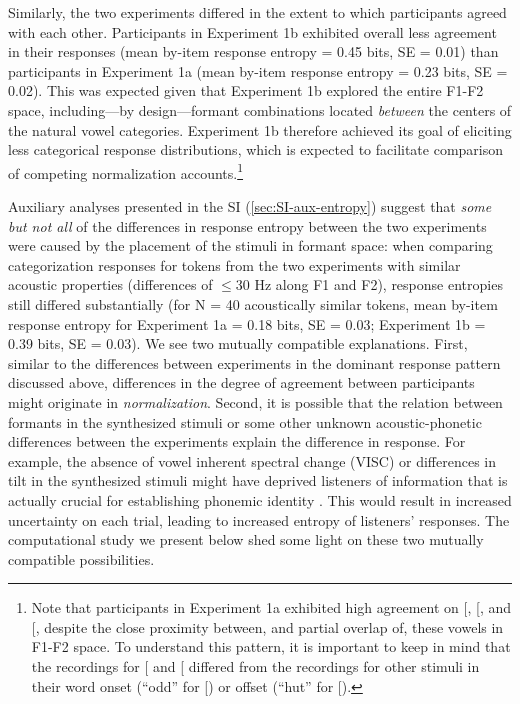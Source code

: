 \documentclass[preprint]{JASA}
\begin{document}
Similarly, the two experiments differed in the extent to which participants agreed with each other. Participants in Experiment 1b exhibited overall less agreement in their responses (mean by-item response entropy = 0.45 bits, SE = 0.01) than participants in Experiment 1a (mean by-item response entropy = 0.23 bits, SE = 0.02). This was expected given that Experiment 1b explored the entire F1-F2 space, including---by design---formant combinations located \emph{between} the centers of the natural vowel categories. Experiment 1b therefore achieved its goal of eliciting less categorical response distributions, which is expected to facilitate comparison of competing normalization accounts.\footnote{Note that participants in Experiment 1a exhibited high agreement on {[}\ipatext{ʌ}{]}, {[}\ipatext{æ}{]}, and {[}\ipatext{ɑ}{]}, despite the close proximity between, and partial overlap of, these vowels in F1-F2 space. To understand this pattern, it is important to keep in mind that the recordings for {[}\ipatext{ʌ}{]} and {[}\ipatext{ɑ}{]} differed from the recordings for other stimuli in their word onset (``odd'' for {[}\ipatext{ɑ}{]}) or offset (``hut'' for {[}\ipatext{ʌ}{]}).}

Auxiliary analyses presented in the SI (\ref{sec:SI-aux-entropy}) suggest that \emph{some but not all} of the differences in response entropy between the two experiments were caused by the placement of the stimuli in formant space: when comparing categorization responses for tokens from the two experiments with similar acoustic properties (differences of \(\le 30\) Hz along F1 and F2), response entropies still differed substantially (for N = 40 acoustically similar tokens, mean by-item response entropy for Experiment 1a = 0.18 bits, SE = 0.03; Experiment 1b = 0.39 bits, SE = 0.03). We see two mutually compatible explanations. First, similar to the differences between experiments in the dominant response pattern discussed above, differences in the degree of agreement between participants might originate in \emph{normalization}. Second, it is possible that the relation between formants in the synthesized stimuli or some other unknown acoustic-phonetic differences between the experiments explain the difference in response. For example, the absence of vowel inherent spectral change (VISC) or differences in tilt in the synthesized stimuli might have deprived listeners of information that is actually crucial for establishing phonemic identity \citep{hillenbrand-nearey1999}. This would result in increased uncertainty on each trial, leading to increased entropy of listeners' responses. The computational study we present below shed some light on these two mutually compatible possibilities.
\end{document}
